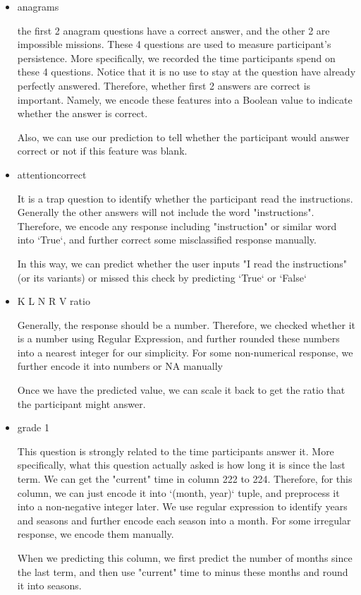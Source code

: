 \documentclass[11pt, a4paper]{article}
\begin{document}
\begin{itemize}
	\item {anagrams}
	\par{the first 2 anagram questions have a correct answer, and the other 2 are impossible missions. These 4 questions are used to measure participant's persistence. More specifically, we recorded the time participants spend on these 4 questions. Notice that it is no use to stay at the question have already perfectly answered. Therefore, whether first 2 answers are correct is important. Namely, we encode these features into a Boolean value to indicate whether the answer is correct.}
	\par{Also, we can use our prediction to tell whether the participant would answer correct or not if this feature was blank.}
	
	\item {attentioncorrect}
	\par{It is a trap question to identify whether the participant read the instructions. Generally the other answers will not include the word "instructions". Therefore, we encode any response including "instruction" or similar word into `True`, and further correct some misclassified response manually.}
	\par{In this way, we can predict whether the user inputs "I read the instructions" (or its variants) or missed this check by predicting `True` or `False`}
	
	\item {K L N R V ratio}
	\par{Generally, the response should be a number. Therefore, we checked whether it is a number using Regular Expression, and further rounded these numbers into a nearest integer for our simplicity. For some non-numerical response, we further encode it into numbers or NA manually}
	\par{Once we have the predicted value, we can scale it back to get the ratio that the participant might answer.}
	
	\item {grade 1}
	\par{This question is strongly related to the time participants answer it. More specifically, what this question actually asked is how long it is since the last term. We can get the "current" time in column 222 to 224. Therefore, for this column, we can just encode it into `(month, year)` tuple, and preprocess it into a non-negative integer later. We use regular expression to identify years and seasons and further encode each season into a month. For some irregular response, we encode them manually.}
	\par{When we predicting this column, we first predict the number of months since the last term, and then use "current" time to minus these months and round it into seasons.
	}
	

\end{itemize}
\end{document}
